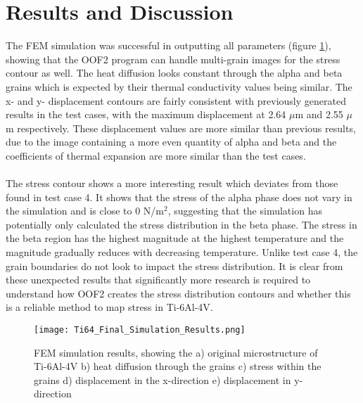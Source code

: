 \documentclass[report.tex]{subfiles}
\begin{document}
\section{Results and Discussion}

The FEM simulation was successful in outputting all parameters (figure \ref{fig:FinalSimulationResults}), showing that the OOF2 program can handle multi-grain images for the stress contour as well. The heat diffusion looks constant through the alpha and beta grains which is expected by their thermal conductivity values being similar. The x- and y- displacement contours are fairly consistent with previously generated results in the test cases, with the maximum displacement at 2.64 $\mu$m and 2.55 $\mu$m respectively. These displacement values are more similar than previous results, due to the image containing a more even quantity of alpha and beta and the coefficients of thermal expansion are more similar than the test cases.\\
\\ The stress contour shows a more interesting result which deviates from those found in test case 4. It shows that the stress of the alpha phase does not vary in the simulation and is close to 0 N/m$^2$, suggesting that the simulation has potentially only calculated the stress distribution in the beta phase. The stress in the beta region has the highest magnitude at the highest temperature and the magnitude gradually reduces with decreasing temperature. Unlike test case 4, the grain boundaries do not look to impact the stress distribution. It is clear from these unexpected results that significantly more research is required to understand how OOF2 creates the stress distribution contours and whether this is a reliable method to map stress in Ti-6Al-4V.

\begin{figure}[h!]
    \centering
    \texttt{[image: Ti64\_Final\_Simulation\_Results.png]}
    \caption{FEM simulation results, showing the a) original microstructure of Ti-6Al-4V b) heat diffusion through the grains c) stress    within the grains d) displacement in the x-direction e) displacement in y-direction}
    \label{fig:FinalSimulationResults}
\end{figure}
\end{document}
